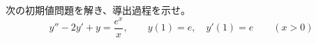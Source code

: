 
次の初期値問題を解き、導出過程を示せ。
\[
y'' - 2y' + y = \frac{e^{x}}{x}, \qquad y(1) = e, \quad y'(1) = e \qquad (x > 0)
\]
